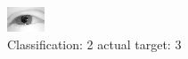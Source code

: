 \begin{figure}[h!]
\begin{center}
\includegraphics[width=0.60\columnwidth]{figures/ID2395_class_2_target_3.png}
\end{center}
\caption{ Classification: 2 actual target: 3}
\label{fig:ID2395_class_2_target_3}
\end{figure}
